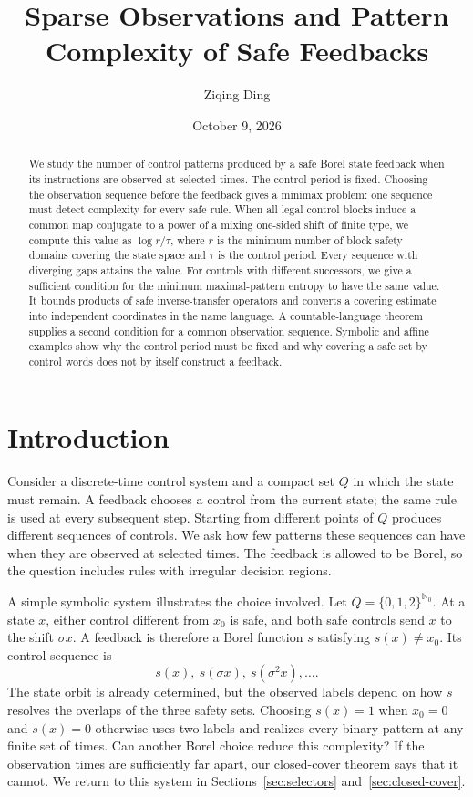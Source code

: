 \documentclass[11pt,reqno]{amsart}
\title[Sparse observations of safe feedbacks]{Sparse Observations and Pattern Complexity of Safe Feedbacks}
\author{Ziqing Ding}
\date{October 9, 2026}
\numberwithin{equation}{section}
\theoremstyle{definition}
\theoremstyle{definition}
\newcommand{\Nzero}{\mathbb N_0}
\begin{document}
\begin{abstract}
We study the number of control patterns produced by a safe Borel state
feedback when its instructions are observed at selected times. The
control period is fixed.
Choosing the observation sequence before the feedback gives a minimax
problem: one sequence must detect complexity for every safe rule.
When all legal control blocks induce a common map conjugate to a power
of a mixing one-sided shift of finite type, we compute this value as
$\log r/\tau$, where $r$ is the minimum number of block safety domains
covering the state space and $\tau$ is the control period. Every sequence
with diverging gaps attains the value. For controls with different
successors, we give a sufficient condition for the minimum
maximal-pattern entropy to have the same value. It bounds products of
safe inverse-transfer operators and converts a covering estimate into
independent coordinates in the name language. A countable-language theorem supplies a
second condition for a common observation sequence. Symbolic and affine
examples show why the control period must be fixed and why covering a
safe set by control words does not by itself construct a feedback.
\end{abstract}
\maketitle

\section{Introduction}\label{sec:intro}

Consider a discrete-time control system and a compact set $Q$ in which
the state must remain. A feedback chooses a control from the current
state; the same rule is used at every subsequent step. Starting from
different points of $Q$ produces different sequences of controls. We
ask how few patterns these sequences can have when they are observed
at selected times. The feedback is allowed to be Borel, so the question
includes rules with irregular decision regions.

A simple symbolic system illustrates the choice involved. Let
$Q=\{0,1,2\}^{\Nzero}$. At a state $x$, either control different
from $x_0$ is safe, and both safe controls send $x$ to the shift
$\sigma x$. A feedback is therefore a Borel function $s$ satisfying
$s(x)\ne x_0$. Its control sequence is
\[
 s(x),\ s(\sigma x),\ s(\sigma^2x),\ldots.
\]
The state orbit is already determined, but the observed labels depend
on how $s$ resolves the overlaps of the three safety sets. Choosing
$s(x)=1$ when $x_0=0$ and $s(x)=0$ otherwise uses two labels and
realizes every binary pattern at any finite set of times. Can another
Borel choice reduce this complexity? If the observation times are
sufficiently far apart, our closed-cover theorem says that it cannot.
We return to this system in Sections~\ref{sec:selectors}
and~\ref{sec:closed-cover}.
\end{document}

